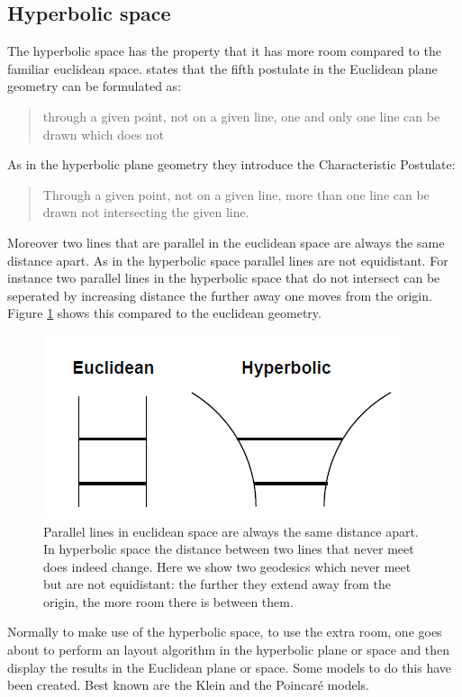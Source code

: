 \documentclass[a4paper,11pt]{kth-mag}
\begin{document}
\newpage\subsection{Hyperbolic space}
The hyperbolic space has the property that it has more room compared to the familiar euclidean space\cite{636718}. \cite{Wolfe} states that the fifth postulate in the Euclidean plane geometry can be formulated as: 
\begin{quote}
through a given point, not on a given line, one and only one line can be drawn which does not
\end{quote}
 As in the hyperbolic plane geometry they introduce the Characteristic Postulate:
\begin{quote}
Through a given point, not on a given line, more than one line can be drawn not intersecting the given line.
\end{quote}
Moreover two lines that are parallel in the euclidean space are always the same distance apart. As in the hyperbolic space parallel lines are not equidistant. For instance two parallel lines in the hyperbolic space that do 
not intersect can be seperated by increasing distance the further away one moves from the origin. Figure \ref{fig:hyperbolic_comp} shows this compared to the euclidean geometry.

\begin{figure}[!htbp]
	\centering
	\includegraphics{HyperBolicGeom}
	\caption{Parallel lines in euclidean space are always the same
distance apart. In hyperbolic space the distance between
two lines that never meet does indeed change. Here we show two
geodesics which never meet but are not equidistant: the further they
extend away from the origin, the more room there is between them.}
	\label{fig:hyperbolic_comp}
\end{figure}

Normally to make use of the hyperbolic space, to use the extra room, one goes about to perform an layout algorithm in the hyperbolic plane or space and then display the results in the Euclidean plane or space. Some models
to do this have been created. Best known are the Klein and the Poincaré models\cite{herman00}.
\end{document}
